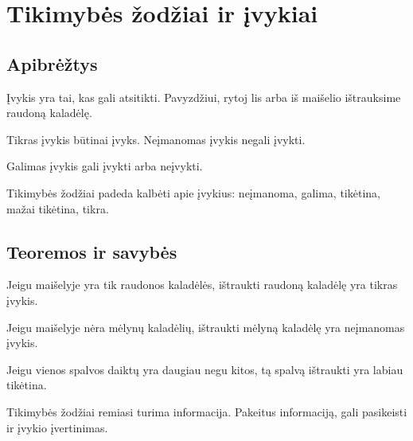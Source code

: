 \section{Tikimybės žodžiai ir įvykiai}\label{sec:tikimybes-zodziai-ir-ivykiai}

\subsection{Apibrėžtys}

\begin{apibreztis}
Įvykis yra tai, kas gali atsitikti. Pavyzdžiui, rytoj lis arba iš maišelio ištrauksime raudoną kaladėlę.
\end{apibreztis}

\begin{apibreztis}
Tikras įvykis būtinai įvyks. Neįmanomas įvykis negali įvykti.
\end{apibreztis}

\begin{apibreztis}
Galimas įvykis gali įvykti arba neįvykti.
\end{apibreztis}

\begin{apibreztis}
Tikimybės žodžiai padeda kalbėti apie įvykius: neįmanoma, galima, tikėtina, mažai tikėtina, tikra.
\end{apibreztis}

\subsection{Teoremos ir savybės}

\begin{savybe}
Jeigu maišelyje yra tik raudonos kaladėlės, ištraukti raudoną kaladėlę yra tikras įvykis.
\end{savybe}

\begin{savybe}
Jeigu maišelyje nėra mėlynų kaladėlių, ištraukti mėlyną kaladėlę yra neįmanomas įvykis.
\end{savybe}

\begin{savybe}
Jeigu vienos spalvos daiktų yra daugiau negu kitos, tą spalvą ištraukti yra labiau tikėtina.
\end{savybe}

\begin{savybe}
Tikimybės žodžiai remiasi turima informacija. Pakeitus informaciją, gali pasikeisti ir įvykio įvertinimas.
\end{savybe}

